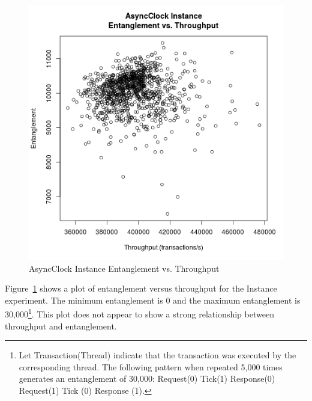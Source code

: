 \begin{figure}[H]
\center
\includegraphics[height=.4\textheight]{async_instance_throughput_entanglement.png}
\caption{AsyncClock Instance Entanglement vs. Throughput}
\label{async_instance_throughput_entanglement}
\end{figure}

Figure~\ref{async_instance_throughput_entanglement} shows a plot of entanglement versus throughput for the Instance experiment.
The minimum entanglement is 0 and the maximum entanglement is 30,000\footnote{Let Transaction(Thread) indicate that the transaction was executed by the corresponding thread.  The following pattern when repeated 5,000 times generates an entanglement of 30,000:  Request(0) Tick(1) Response(0) Request(1) Tick (0) Response (1).}.
This plot does not appear to show a strong relationship between throughput and entanglement.

